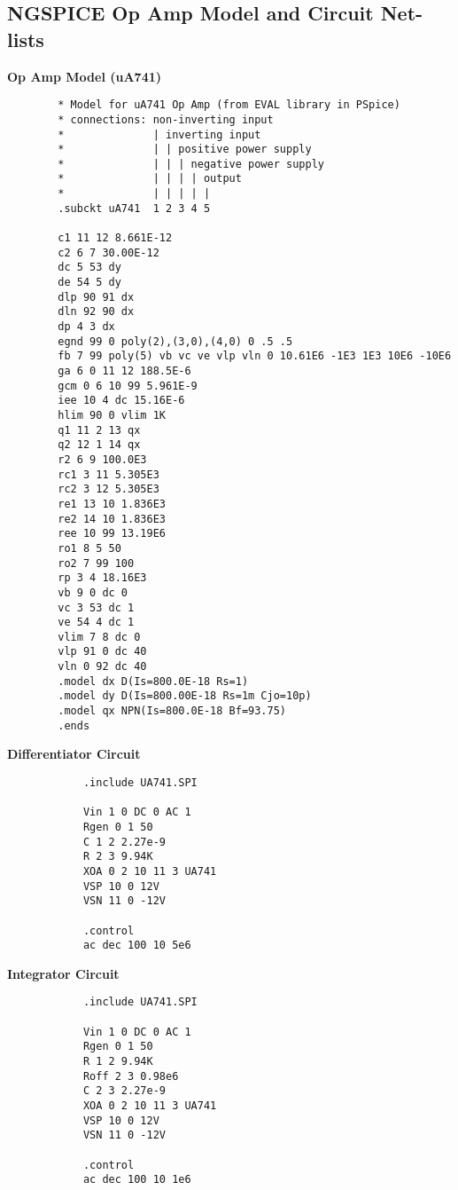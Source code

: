 \subsection*{NGSPICE Op Amp Model and Circuit Net-lists}
    \textbf{Op Amp Model (uA741)}
	\begin{verbatim}
		* Model for uA741 Op Amp (from EVAL library in PSpice)
		* connections: non-inverting input
		*              | inverting input
		*              | | positive power supply
		*              | | | negative power supply
		*              | | | | output
		*              | | | | |
		.subckt uA741  1 2 3 4 5
		
		c1 11 12 8.661E-12
		c2 6 7 30.00E-12
		dc 5 53 dy
		de 54 5 dy
		dlp 90 91 dx
		dln 92 90 dx
		dp 4 3 dx
		egnd 99 0 poly(2),(3,0),(4,0) 0 .5 .5
		fb 7 99 poly(5) vb vc ve vlp vln 0 10.61E6 -1E3 1E3 10E6 -10E6
		ga 6 0 11 12 188.5E-6
		gcm 0 6 10 99 5.961E-9
		iee 10 4 dc 15.16E-6
		hlim 90 0 vlim 1K
		q1 11 2 13 qx
		q2 12 1 14 qx
		r2 6 9 100.0E3
		rc1 3 11 5.305E3
		rc2 3 12 5.305E3
		re1 13 10 1.836E3
		re2 14 10 1.836E3
		ree 10 99 13.19E6
		ro1 8 5 50
		ro2 7 99 100
		rp 3 4 18.16E3
		vb 9 0 dc 0
		vc 3 53 dc 1
		ve 54 4 dc 1
		vlim 7 8 dc 0
		vlp 91 0 dc 40
		vln 0 92 dc 40
		.model dx D(Is=800.0E-18 Rs=1)
		.model dy D(Is=800.00E-18 Rs=1m Cjo=10p)
		.model qx NPN(Is=800.0E-18 Bf=93.75)
		.ends
	\end{verbatim}

	\begin{minipage}{0.5\textwidth}
		\textbf{Differentiator Circuit}
		\begin{verbatim}
			.include UA741.SPI

			Vin 1 0 DC 0 AC 1 
			Rgen 0 1 50
			C 1 2 2.27e-9
			R 2 3 9.94K
			XOA 0 2 10 11 3 UA741
			VSP 10 0 12V
			VSN 11 0 -12V

			.control
			ac dec 100 10 5e6
		\end{verbatim}
	\end{minipage}%
	\begin{minipage}{0.5\textwidth}
		\textbf{Integrator Circuit}
		\begin{verbatim}
			.include UA741.SPI

			Vin 1 0 DC 0 AC 1 
			Rgen 0 1 50
			R 1 2 9.94K
			Roff 2 3 0.98e6
			C 2 3 2.27e-9
			XOA 0 2 10 11 3 UA741
			VSP 10 0 12V
			VSN 11 0 -12V

			.control
			ac dec 100 10 1e6
		\end{verbatim}
	\end{minipage}